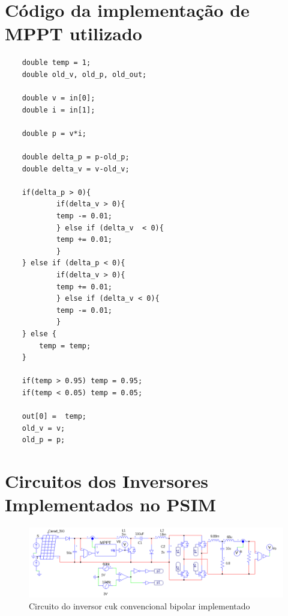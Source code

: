 \documentclass[
	12pt,				%
	openany,
	onseside,
	a4paper,			%
	english,			%
	french,				%
	spanish,			%
	brazil,				%
	]{abntex2}
\begin{document}
\begin{anexosenv}

	\partanexos
	\chapter{Código da implementação de MPPT utilizado}\label{anex:mppt_code}


	\begin{lstlisting}
	double temp = 1;
	double old_v, old_p, old_out;

	double v = in[0];
	double i = in[1];

	double p = v*i;

	double delta_p = p-old_p;
	double delta_v = v-old_v;

	if(delta_p > 0){
			if(delta_v > 0){
			temp -= 0.01; 
			} else if (delta_v  < 0){
			temp += 0.01;
			}
	} else if (delta_p < 0){
			if(delta_v > 0){
			temp += 0.01;
			} else if (delta_v < 0){
			temp -= 0.01; 
			}
	} else {
		temp = temp;
	}

	if(temp > 0.95) temp = 0.95;
	if(temp < 0.05) temp = 0.05;

	out[0] =  temp;
	old_v = v;
	old_p = p;

	\end{lstlisting}

	\chapter{Circuitos dos Inversores Implementados no PSIM} \label{anex:circ_images}

	\begin{figure}
		\centering
		\includegraphics[width=\linewidth]{comp_conv_circ_clean}
		\caption{Circuito do inversor cuk convencional bipolar implementado}	


\end{figure}
\end{anexosenv}
\end{document}

